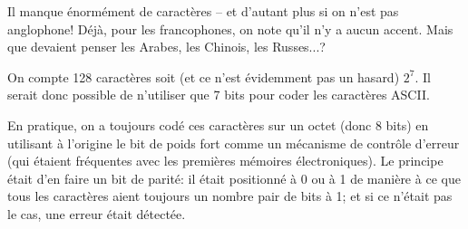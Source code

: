 \documentclass[12pt]{article}
\begin{document}
\begin{MaReponse}
	Il manque énormément de caractères -- et d'autant plus si on n'est pas anglophone! Déjà, pour les francophones, on note qu'il n'y a aucun accent. Mais que devaient penser les Arabes, les Chinois, les Russes...?
\end{MaReponse}

\begin{MaReponse}
	On compte 128 caractères soit (et ce n'est évidemment pas un hasard) $2^7$. Il serait donc possible de n'utiliser que 7 bits pour coder les caractères ASCII.
	
	En pratique, on a toujours codé ces caractères sur un octet (donc 8 bits) en utilisant à l'origine le bit de poids fort comme un mécanisme de contrôle d'erreur (qui étaient fréquentes avec les premières mémoires électroniques). Le principe était d'en faire un bit de parité: il était positionné à 0 ou à 1 de manière à ce que tous les caractères aient toujours un nombre pair de bits à 1; et si ce n'était pas le cas, une erreur était détectée.
\end{MaReponse}
	
\end{document}
